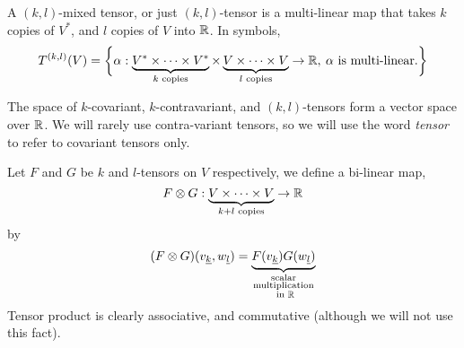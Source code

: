 \documentclass[../main-manifolds.tex]{subfiles}
\begin{document}
\begin{definition}
    A $(k,l)$-mixed tensor, or just $(k,l)$-tensor is a multi-linear map that takes $k$ copies of $V^*$, and $l$ copies of $V$ into $\mathbb{R}$. In symbols, 
    \[
        T^{(k,l)}(V) = \biggl\{{\alpha: \underbrace{V^*\times\cdots\times V^*}_{k\text{ copies}}\times \underbrace{V\times\cdots\times V}_{l\text{ copies}}\to\mathbb{R},\: \alpha\text{ is multi-linear.}}\biggr\}
    \]
\end{definition}

The space of $k$-covariant, $k$-contravariant, and $(k,l)$-tensors form a vector space over $\mathbb{R}$. We will rarely use contra-variant tensors, so we will use the word \emph{tensor} to refer to covariant tensors only.

\begin{definition}
    Let $F$ and $G$ be $k$ and $l$-tensors on $V$ respectively, we define a bi-linear map,
    \[
        F\otimes G: \underbrace{V\times \cdots \times V}_{k+l\text{ copies}}\to\mathbb{R}
    \]
    by
    \[
        (F\otimes G)(\Ul{v}[k],\Ul{w}[l]) = \underbrace{F(\Ul{v}[k])G(\Ul{w}[l])}_{\substack{\text{scalar}\\ \text{multiplication}\\ \text{ in }\real}}
    \]
    Tensor product is clearly associative, and commutative (although we will not use this fact).
\end{definition}
\end{document}
